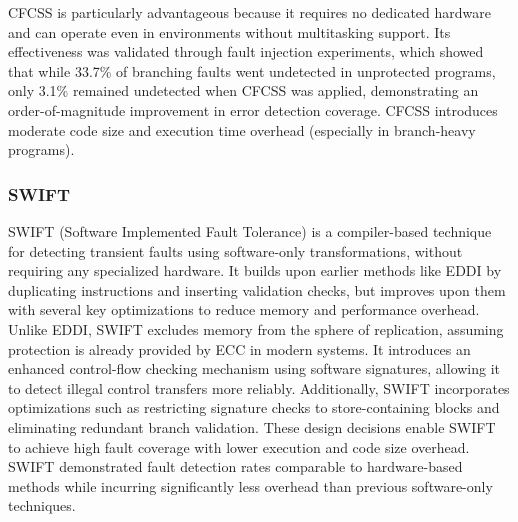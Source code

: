 CFCSS is particularly advantageous because it requires no dedicated hardware and can operate even in environments without multitasking support. Its effectiveness was validated through fault injection experiments, which showed that while 33.7\% of branching faults went undetected in unprotected programs, only 3.1\% remained undetected when CFCSS was applied, demonstrating an order-of-magnitude improvement in error detection coverage. CFCSS introduces moderate code size and execution time overhead (especially in branch-heavy programs).

\subsubsection{SWIFT}

SWIFT \cite{swift} (Software Implemented Fault Tolerance) is a compiler-based technique for detecting transient faults using software-only transformations, without requiring any specialized hardware. It builds upon earlier methods like EDDI by duplicating instructions and inserting validation checks, but improves upon them with several key optimizations to reduce memory and performance overhead. Unlike EDDI, SWIFT excludes memory from the sphere of replication, assuming protection is already provided by ECC in modern systems. It introduces an enhanced control-flow checking mechanism using software signatures, allowing it to detect illegal control transfers more reliably. Additionally, SWIFT incorporates optimizations such as restricting signature checks to store-containing blocks and eliminating redundant branch validation. These design decisions enable SWIFT to achieve high fault coverage with lower execution and code size overhead. SWIFT demonstrated fault detection rates comparable to hardware-based methods while incurring significantly less overhead than previous software-only techniques.